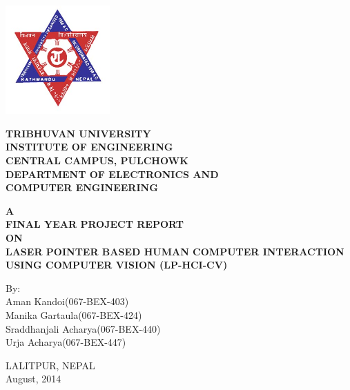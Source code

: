 \begin{titlepage}
    \begin{center}
        \vspace*{0.5cm}
        
        \begin{center}
        \includegraphics[width=0.3\textwidth]{logo}
        \end{center}
        
        \large
        {\textbf{TRIBHUVAN UNIVERSITY} \\
        \textbf{INSTITUTE OF ENGINEERING} \\
        \textbf{CENTRAL CAMPUS, PULCHOWK}\\
        \textbf{DEPARTMENT OF ELECTRONICS AND \\COMPUTER ENGINEERING}\\}
        
        \vspace{2cm}
        
        \normalsize
        \textbf{A \\FINAL YEAR PROJECT REPORT\\ ON\\
       LASER POINTER BASED HUMAN­ COMPUTER INTERACTION USING COMPUTER VISION (LP-­HCI-­CV)}

		\vspace{1.5cm}
        
        By:\\
        Aman Kandoi(067­-BEX-­403)\\
Manika Gartaula(067­-BEX-­424)\\
Sraddhanjali Acharya(067-­BEX-­440)\\
Urja Acharya(067­-BEX-­447)\\

        
        \vspace{2cm}
        
        
LALITPUR, NEPAL\\
August, 2014

        
        
    \end{center}
\end{titlepage}